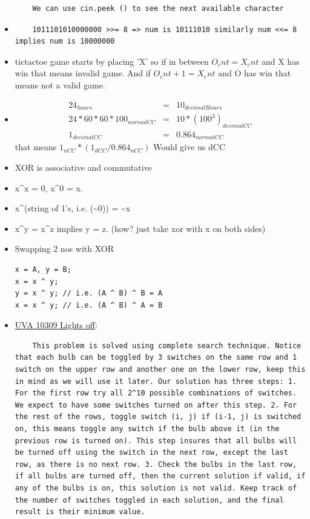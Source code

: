 \documentclass[8pt, a4paper, oneside, twocolumn]{extarticle}
\begin{document}
\begin{itemize}
    \begin{verbatim}
    We can use cin.peek () to see the next available character
    \end{verbatim}
    \item
    \begin{verbatim}
    1011101010000000 >>= 8 => num is 10111010 similarly num <<= 8 implies num is 10000000
    \end{verbatim}
    \item tictactoe game starts by placing 'X' so if in between $O_cnt = X_cnt$ and X has win that means invalid game. And if $O_cnt + 1 = X_cnt$ and O has win that means not a valid game.
    \item 
    \begin{eqnarray}
    24_{hours} & = & 10_{decimalHours} \\
    24 * 60 * 60 * 100_{normalCC} & = & 10 * (100^3)_{decimalCC} \\
    1_{decimalCC} & = & 0.864_{normalCC} 
    \end{eqnarray}
    that means $1_{nCC} * (1_{dCC}/0.864_{nCC})$ Would give us dCC
    \item XOR is associative and commutative
    \item x\^{}x = 0, x\^{}0 = x.
    \item x\^{}(string of 1's, i.e. (\~{}0)) = \~{}x
    \item x\^{}y = x\^{}z implies y = z. (how? just take xor with x on both sides)
    \item Swapping 2 nos with XOR
    \begin{verbatim}
x = A, y = B;
x = x ^ y;
y = x ^ y; // i.e. (A ^ B) ^ B = A
x = x ^ y; // i.e. (A ^ B) ^ A = B
    \end{verbatim}
    \item \href{}{UVA 10309 Lights off}:
    \begin{verbatim}
    This problem is solved using complete search technique. Notice that each bulb can be toggled by 3 switches on the same row and 1 switch on the upper row and another one on the lower row, keep this in mind as we will use it later. Our solution has three steps: 1. For the first row try all 2^10 possible combinations of switches. We expect to have some switches turned on after this step. 2. For the rest of the rows, toggle switch (i, j) if (i-1, j) is switched on, this means toggle any switch if the bulb above it (in the previous row is turned on). This step insures that all bulbs will be turned off using the switch in the next row, except the last row, as there is no next row. 3. Check the bulbs in the last row, if all bulbs are turned off, then the current solution if valid, if any of the bulbs is on, this solution is not valid. Keep track of the number of switches toggled in each solution, and the final result is their minimum value.

\end{verbatim}
\end{itemize}
\end{document}

